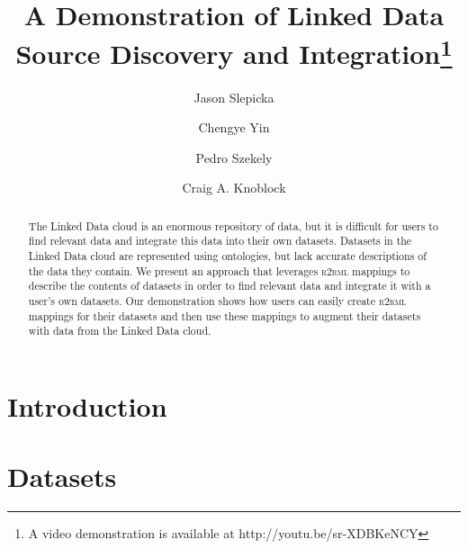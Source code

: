 \documentclass[runningheads,a4paper]{llncs}
\newcommand{\rtworml}{\textsc{r2rml}\xspace}
\begin{document}
\mainmatter  %
\title{A Demonstration of Linked Data Source Discovery and Integration\protect\footnote{A video demonstration is available at http://youtu.be/sr-XDBKeNCY}}
%
\author{Jason Slepicka%
\and Chengye Yin\and Pedro Szekely\and Craig A. Knoblock}
%
\maketitle
\begin{abstract}
The Linked Data cloud is an enormous repository of data, but it is difficult for users to find relevant data and integrate this data into their own datasets. 
Datasets in the Linked Data cloud are represented using ontologies, but lack accurate descriptions of the data they contain.
We present an approach that leverages \rtworml mappings to describe the contents of datasets in order to find relevant data and integrate it with a user's own datasets.
Our demonstration shows how users can easily create \rtworml mappings for their datasets and then use these mappings to augment their datasets with data from the Linked Data cloud.
\end{abstract}

\section{Introduction} 

\section{Datasets}

\end{document}
